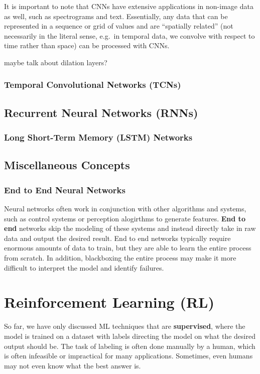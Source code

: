 \documentclass[12pt]{report}
\theoremstyle{definition}
\theoremstyle{remark}
\begin{document}
It is important to note that CNNs have extensive applications in non-image data as well, such as spectrograms and text. Essentially, any data that can be represented in a sequence or grid of values and are ``spatially related'' (not necessarily in the literal sense, e.g.\ in temporal data, we convolve with respect to time rather than space) can be processed with CNNs.

maybe talk about dilation layers?

\subsection{Temporal Convolutional Networks (TCNs)}

\section{Recurrent Neural Networks (RNNs)}

\subsection{Long Short-Term Memory (LSTM) Networks}

\section{Miscellaneous Concepts}
\subsection{End to End Neural Networks}
Neural networks often work in conjunction with other algorithms and systems, such as control systems or perception alogirthms to generate features. \textbf{End to end} networks skip the modeling of these systems and instead directly take in raw data and output the desired result. End to end networks typically require enormous amounts of data to train, but they are able to learn the entire process from scratch. In addition, blackboxing the entire process may make it more difficult to interpret the model and identify failures.



\chapter{Reinforcement Learning (RL)} %
So far, we have only discussed ML techniques that are \textbf{supervised}, where the model is trained on a dataset with labels directing the model on what the desired output should be. The task of labeling is often done manually by a human, which is often infeasible or impractical for many applications. Sometimes, even humans may not even know what the best answer is.
\end{document}
